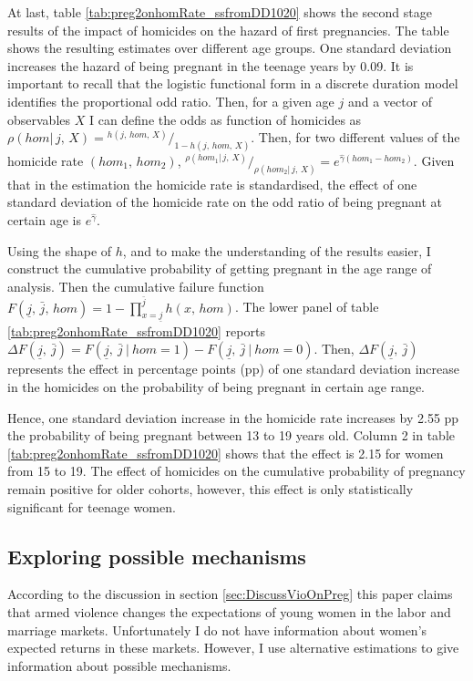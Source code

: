 \documentclass[a4paper,10pt,twocolumn,preprint,3p,authoryear]{elsarticle}
\newcommand*\rfrac[2]{{}^{#1}\!/_{#2}}
\begin{document}
At last, table \ref{tab:preg2onhomRate_ssfromDD1020} shows the second stage results of the impact of homicides on the hazard of first pregnancies. The table shows the resulting estimates over different age groups. One standard deviation increases the hazard of being pregnant in the teenage years by 0.09. It is important to recall that the logistic functional form in a discrete duration model identifies the proportional odd ratio. Then, for a given age $j$ and a vector of observables $X$ I can define the odds as function of homicides as $\rho\left(hom|\, j,\, X\right)=\rfrac{h\left(j,\, hom,\, X\right)}{1-h\left(j,\, hom,\, X\right)}$. Then, for two different values of the homicide rate $\left(hom_{1},\, hom_{2}\right)$, $\rfrac{\rho\left(hom_{1}|\, j,\, X\right)}{\rho\left(hom_{2}|\, j,\, X\right)}=e^{\hat{\gamma}\left(hom_{1}-hom_{2}\right)}$. Given that in the estimation the homicide rate is standardised, the effect of one standard deviation of the homicide rate on the odd ratio of being pregnant at certain age is $e^{\hat{\gamma}}$.  

Using the shape of $h$, and to make the understanding of the results easier, I construct the cumulative probability of getting pregnant in the age range of analysis. Then the cumulative failure function $F\left(\underline{j},\,\bar{j},\, hom\right)=1-\prod_{x=\underline{j}}^{\bar{j}}h\left(x,\, hom\right)$. The lower panel of table \ref{tab:preg2onhomRate_ssfromDD1020} reports $\Delta F\left(\underline{j}, \ \bar{j}\right)=F\left(\underline{j}, \ \bar{j} \ | \ hom=1 \right)-F\left(\underline{j}, \ \bar{j} \ | \ hom=0\right)$. Then, $\Delta F\left(\underline{j}, \ \bar{j}\right)$ represents the effect in percentage points (pp) of one standard deviation increase in the homicides on the probability of being pregnant in certain age range. 

Hence, one standard deviation increase in the homicide rate increases by 2.55 pp the probability of being pregnant between 13 to 19 years old. Column 2 in table \ref{tab:preg2onhomRate_ssfromDD1020} shows that the effect is 2.15 for women from 15 to 19. The effect of homicides on the cumulative probability of pregnancy remain positive for older cohorts, however, this effect is only statistically significant for teenage women. 

\subsection{Exploring possible mechanisms}

According to the discussion in section \ref{sec:DiscussVioOnPreg} this paper claims that armed violence changes the expectations of young women in the labor and marriage markets. Unfortunately I do not have information about women's expected returns in these markets. However, I use alternative estimations to give information about possible mechanisms.
\end{document}

